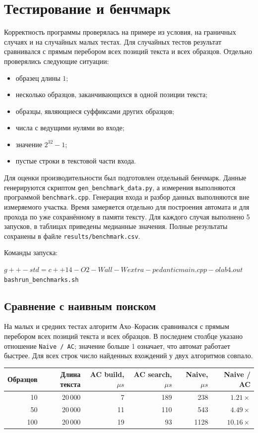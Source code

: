 \section{Тестирование и бенчмарк}

Корректность программы проверялась на примере из условия, на граничных случаях и на случайных малых
тестах. Для случайных тестов результат сравнивался с прямым перебором всех позиций текста и всех
образцов. Отдельно проверялись следующие ситуации:
\begin{itemize}
\item образец длины \(1\);
\item несколько образцов, заканчивающихся в одной позиции текста;
\item образцы, являющиеся суффиксами других образцов;
\item числа с ведущими нулями во входе;
\item значение \(2^{32} - 1\);
\item пустые строки в текстовой части входа.
\end{itemize}

Для оценки производительности был подготовлен отдельный бенчмарк. Данные генерируются скриптом
\texttt{gen\_benchmark\_data.py}, а измерения выполняются программой \texttt{benchmark.cpp}. Генерация
входа и разбор данных выполняются вне измеряемого участка. Время замеряется отдельно для построения
автомата и для прохода по уже сохранённому в памяти тексту. Для каждого случая выполнено 5 запусков,
в таблицах приведены медианные значения. Полные результаты сохранены в файле
\texttt{results/benchmark.csv}.

Команды запуска:
\begin{alltt}
$ g++ -std=c++14 -O2 -Wall -Wextra -pedantic main.cpp -o lab4.out
$ bash run_benchmarks.sh
\end{alltt}

\subsection{Сравнение с наивным поиском}

На малых и средних тестах алгоритм Ахо--Корасик сравнивался с прямым перебором всех позиций текста и
всех образцов. В последнем столбце указано отношение \texttt{Naive / AC}; значение больше 1 означает,
что автомат работает быстрее. Для всех строк число найденных вхождений у двух алгоритмов совпало.

\begin{center}
\begin{tabular}{|r|r|r|r|r|r|}
\hline
\rowcolor{lightgray}
Образцов & Длина текста & AC build, \(\mu s\) & AC search, \(\mu s\) & Naive, \(\mu s\) & Naive / AC \\
\hline
10 & 20\,000 & 7 & 189 & 238 & \(1.21\times\) \\
\hline
50 & 20\,000 & 11 & 110 & 543 & \(4.49\times\) \\
\hline
100 & 20\,000 & 19 & 93 & 1128 & \(10.16\times\) \\
\hline
\end{tabular}
\end{center}

